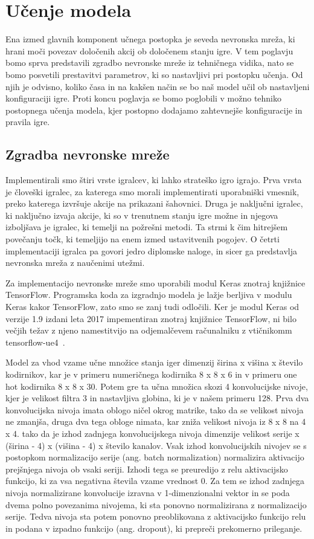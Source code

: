 \documentclass[a4paper, 12pt]{book}
\begin{document}
\chapter{Učenje modela}
\label{chucenjemodela}
Ena izmed glavnih komponent učnega postopka je seveda nevronska mreža, ki hrani moči povezav določenih akcij ob določenem stanju igre.
V tem poglavju bomo sprva predstavili zgradbo nevronske mreže iz tehničnega vidika, nato se bomo posvetili prestavitvi parametrov, ki so nastavljivi pri postopku učenja.
Od njih je odvisno, koliko časa in na kakšen način se bo naš model učil ob nastavljeni konfiguraciji igre.
Proti koncu poglavja se bomo poglobili v možno tehniko postopnega učenja modela, kjer postopno dodajamo zahtevnejše konfiguracije in pravila igre.

\section{Zgradba nevronske mreže}
Implementirali smo štiri vrste igralcev, ki lahko strateško igro igrajo.
Prva vrsta je človeški igralec, za katerega smo morali implementirati uporabniški vmesnik, preko katerega izvršuje akcije na prikazani šahovnici.
Druga je naključni igralec, ki naključno izvaja akcije, ki so v trenutnem stanju igre možne in njegova izboljšava je igralec, ki temelji na požrešni metodi.
Ta strmi k čim hitrejšem povečanju točk, ki temeljijo na enem izmed ustavitvenih pogojev.
O četrti implementaciji igralca pa govori jedro diplomske naloge, in sicer ga predstavlja nevronska mreža z naučenimi utežmi.

Za implementacijo nevronske mreže smo uporabili modul Keras znotraj knjižnice TensorFlow.
Programska koda za izgradnjo modela je lažje berljiva v modulu Keras kakor TensorFlow, zato smo se zanj tudi odločili.
Ker je modul Keras od verzije 1.9 izdani leta 2017 impementiran znotraj knjižnice TensorFlow, ni bilo večjih težav z njeno namestitvijo na odjemalčevem računalniku z vtičnikomm tensorflow-ue4~\cite{ue4tf}.

Model za vhod vzame učne množice stanja iger dimenzij širina x višina x število kodirnikov, kar je v primeru numeričnega kodirnika 8 x 8 x 6 in v primeru one hot kodirnika 8 x 8 x 30.
Potem gre ta učna množica skozi 4 konvolucijske nivoje, kjer je velikost filtra 3 in nastavljiva globina, ki je v našem primeru 128.
Prva dva konvolucijska nivoja imata oblogo ničel okrog matrike, tako da se velikost nivoja ne zmanjša, druga dva tega obloge nimata, kar zniža velikost nivoja iz 8 x 8 na 4 x 4.
tako da je izhod zadnjega konvolucijskega nivoja dimenzije velikost serije x (širina - 4) x (višina - 4) x število kanalov.
Vsak izhod konvolucijskih nivojev se s postopkom normalizacijo serije (ang. batch normalization) normalizira aktivacijo prejšnjega nivoja ob vsaki seriji.
Izhodi tega se preuredijo z relu aktivacijsko funkcijo, ki za vsa negativna števila vzame vrednost 0.
Za tem se izhod zadnjega nivoja normalizirane konvolucije izravna v 1-dimenzionalni vektor in se poda dvema polno povezanima nivojema, ki sta ponovno normalizirana z normalizacijo serije.
Tedva nivoja sta potem ponovno preoblikovana z aktivacijsko funkcijo relu in podana v izpadno funkcijo (ang. dropout), ki prepreči prekomerno prileganje.
\end{document}
